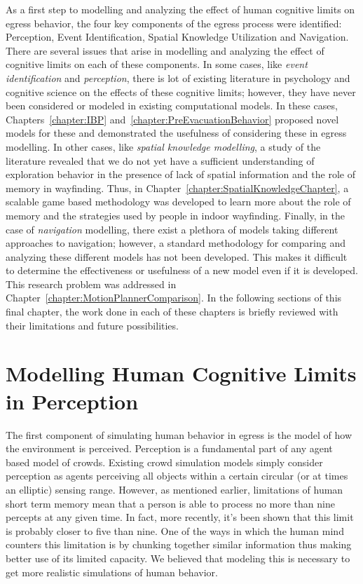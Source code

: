 

As a first step to modelling and analyzing the effect of human cognitive limits on egress behavior, the four key components of the egress process were identified: Perception, Event Identification, Spatial Knowledge Utilization and Navigation.
There are several issues that arise in modelling and analyzing the effect of cognitive limits on each of these components. In some cases, like \emph{event identification} and \emph{perception}, there is lot of existing literature in psychology and cognitive science on the effects of these cognitive limits; however, they have never been considered or modeled in existing computational models. In these cases, Chapters~\ref{chapter:IBP} and~\ref{chapter:PreEvacuationBehavior} proposed novel models for these and demonstrated the usefulness of considering these in egress modelling. In other cases, like \emph{spatial knowledge modelling}, a study of the literature revealed that we do not yet have a sufficient understanding of exploration behavior in the presence of lack of spatial information and the role of memory in wayfinding. Thus, in Chapter~\ref{chapter:SpatialKnowledgeChapter}, a scalable game based methodology was developed to learn more about the role of memory and the strategies used by people in indoor wayfinding. Finally, in the case of \emph{navigation} modelling, there exist a plethora of models taking different approaches to navigation; however, a standard methodology for comparing and analyzing these different models has not been developed. This makes it difficult to determine the effectiveness or usefulness of a new model even if it is developed. This research problem was addressed in Chapter~\ref{chapter:MotionPlannerComparison}. In the following sections of this final chapter, the work done in each of these chapters is briefly reviewed with their limitations and future possibilities.

\section{Modelling Human Cognitive Limits in Perception} %
\label{sec:an_information_processing_based_approach_to_perception}

The first component of simulating human behavior in egress is the model of how the environment is perceived. Perception is a fundamental part of any agent based model of crowds. Existing crowd simulation models simply consider perception as agents perceiving all objects within a certain circular (or at times an elliptic) sensing range. However, as mentioned earlier, limitations of human short term memory mean that a person is able to process no more than nine percepts at any given time. In fact, more recently, it's been shown that this limit is probably closer to five than nine. One of the ways in which the human mind counters this limitation is by chunking together similar information thus making better use of its limited capacity. We believed that modeling this is necessary to get more realistic simulations of human behavior.

